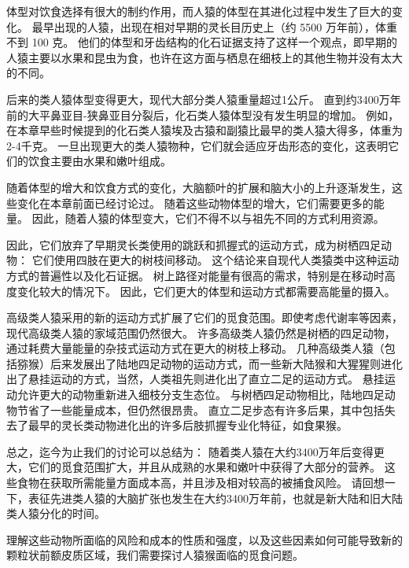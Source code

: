 体型对饮食选择有很大的制约作用，而人猿的体型在其进化过程中发生了巨大的变化。
最早出现的人猿，出现在相对早期的灵长目历史上（约 5500 万年前），体重不到 100 克。
他们的体型和牙齿结构的化石证据支持了这样一个观点，即早期的人猿主要以水果和昆虫为食\cite{fleagle2013primate,rose2006beginning}，也许在这方面与栖息在细枝上的其他生物并没有太大的不同。


后来的类人猿体型变得更大，现代大部分类人猿重量超过1公斤。
直到约3400万年前的大平鼻亚目-狭鼻亚目分裂后，化石类人猿体型没有发生明显的增加\cite{williams2010new}。
例如，在本章早些时候提到的化石类人猿埃及古猿和副猿比最早的类人猿大得多，体重为2-4千克。
一旦出现更大的类人猿物种，它们就会适应牙齿形态的变化，这表明它们的饮食主要由水果\cite{williams2010new}和嫩叶\cite{kirk2001diets,dominy2004fruits}组成。


随着体型的增大和饮食方式的变化，大脑额叶的扩展和脑大小的上升逐渐发生，这些变化在本章前面已经讨论过。
随着这些动物体型的增大，它们需要更多的能量。
因此，随着人猿的体型变大，它们不得不以与祖先不同的方式利用资源。


因此，它们放弃了早期灵长类使用的跳跃和抓握式的运动方式，成为树栖四足动物：
它们使用四肢在更大的树枝间移动。
这个结论来自现代人类猿类中这种运动方式的普遍性\cite{schmitt2010primate}以及化石证据\cite{fleagle2013primate}。
树上路径对能量有很高的需求\cite{janson1988food}，特别是在移动时高度变化较大的情况下。
因此，它们更大的体型和运动方式都需要高能量的摄入。


高级类人猿采用的新的运动方式扩展了它们的觅食范围。即使考虑代谢率等因素，现代高级类人猿的家域范围仍然很大\cite{martin1981relative}。
许多高级类人猿仍然是树栖的四足动物，通过耗费大量能量的杂技式运动方式在更大的树枝上移动。
几种高级类人猿（包括猕猴）后来发展出了陆地四足动物的运动方式，而一些新大陆猴和大猩猩则进化出了悬挂运动的方式，当然，人类祖先则进化出了直立二足的运动方式。
悬挂运动允许更大的动物重新进入细枝分支生态位。
与树栖四足动物相比，陆地四足动物节省了一些能量成本\cite{janson1988food}，但仍然很昂贵。
直立二足步态有许多后果，其中包括失去了最早的灵长类动物进化出的许多后肢抓握专业化特征，如食果猴。


总之，迄今为止我们的讨论可以总结为：
随着类人猿在大约3400万年后变得更大，它们的觅食范围扩大，并且从成熟的水果和嫩叶中获得了大部分的营养。
这些食物在获取所需能量方面成本高，并且涉及相对较高的被捕食风险。
请回想一下，表征先进类人猿的大脑扩张也发生在大约3400万年前，也就是新大陆和旧大陆类人猿分化的时间。


理解这些动物所面临的风险和成本的性质和强度，以及这些因素如何可能导致新的颗粒状前额皮质区域，我们需要探讨人猿猴面临的觅食问题。



